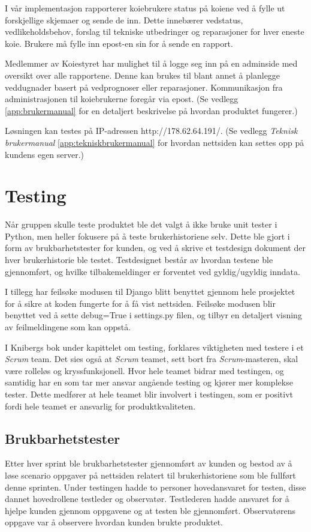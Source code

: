 \documentclass[12pt,a4paper,norsk]{article}
\begin{document}
  I vår implementasjon rapporterer koiebrukere status på koiene ved å fylle ut forskjellige skjemaer og sende de inn. Dette innebærer vedstatus, vedlikeholdsbehov, forslag til tekniske utbedringer og reparasjoner for hver eneste koie. Brukere må fylle inn epost-en sin for å sende en rapport.

  Medlemmer av Koiestyret har mulighet til å logge seg inn på en adminside med oversikt over alle rapportene. Denne kan brukes til blant annet å planlegge veddugnader basert på vedprognoser eller reparasjoner. Kommunikasjon fra administrasjonen til koiebrukerne foregår via epost. (Se vedlegg \cref{app:brukermanual}  for en detaljert beskrivelse på hvordan produktet fungerer.)

  Løsningen kan testes på IP-adressen http://178.62.64.191/. (Se vedlegg \textit{Teknisk brukermanual} \cref{app:tekniskbrukermanual} for hvordan nettsiden kan settes opp på kundens egen server.)

  \section{Testing}

Når gruppen skulle teste produktet ble det valgt å ikke bruke unit tester i Python, men heller fokusere på å teste brukerhistoriene selv. Dette ble gjort i form av brukbarhetstester for kunden, og ved å skrive et testdesign dokument der hver brukerhistorie ble testet. Testdesignet består av hvordan testene ble gjennomført, og hvilke tilbakemeldinger er forventet ved gyldig/ugyldig inndata.

I tillegg har feilsøke modusen til Django blitt benyttet gjennom hele prosjektet for å sikre at koden fungerte for å få vist nettsiden. Feilsøke modusen blir benyttet ved å sette debug=True i settings.py filen, og tilbyr en detaljert visning av feilmeldingene som kan oppstå.

I Knibergs bok under kapittelet om testing\cite[side 128-131]{kniberg}, forklares viktigheten med testere i et \textit{Scrum} team. Det sies også at \textit{Scrum} teamet, sett bort fra \textit{Scrum}-masteren, skal være rolleløs og kryssfunksjonell. Hvor hele teamet bidrar med testingen, og samtidig har en som tar mer ansvar angående testing og kjører mer komplekse tester. Dette medfører at hele teamet blir involvert i testingen, som er positivt fordi hele teamet er ansvarlig for produktkvaliteten.

 \subsection{Brukbarhetstester}
Etter hver sprint ble brukbarhetstester gjennomført av kunden og bestod av å løse scenario oppgaver på nettsiden relatert til brukerhistoriene som ble fullført denne sprinten. Under testingen hadde to personer hovedansvaret for testen, disse dannet hovedrollene testleder og observatør. Testlederen hadde ansvaret for å hjelpe kunden gjennom oppgavene og at testen ble gjennomført. Observatørens oppgave var å observere hvordan kunden brukte produktet.
\end{document}
